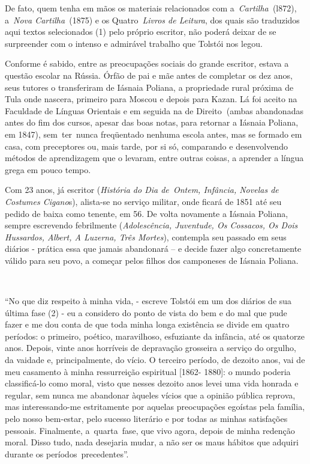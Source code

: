 De fato, quem tenha em mãos os materiais relacionados com
a~\emph{Cartilha~}(l872), a~\emph{Nova Cartilha~}(1875) e os
Quatro~\emph{Livros de Leitura}, dos quais são traduzidos aqui textos
selecionados (1) pelo próprio escritor, não poderá deixar de se
surpreender com o intenso e admirável trabalho que Tolstói nos legou.

Conforme é sabido, entre as preocupações sociais do grande escritor,
estava a questão escolar na Rússia. Órfão de pai e mãe antes de
completar os dez anos, seus tutores o transferiram de Iásnaia Poliana, a
propriedade rural próxima de Tula onde nascera, primeiro para Moscou e
depois para Kazan. Lá foi aceito na Faculdade de Línguas Orientais e em
seguida na de Direito\textbf{~}(ambas abandonadas antes do fim dos
cursos, apesar das boas notas, para retornar a Iásnaia Poliana, em
1847), sem~ter~nunca freqüentado nenhuma escola antes, mas se formado em
casa, com preceptores ou, mais tarde, por si só, comparando e
desenvolvendo métodos de aprendizagem que o levaram, entre outras
coisas, a aprender a língua grega em pouco tempo.

Com 23 anos, já escritor (\emph{História do Dia de~Ontem, Infância,
Novelas de Costumes Cigano}s), alista-se no serviço militar, onde ficará
de 1851 até seu pedido de baixa como tenente, em 56. De volta novamente
a Iásnaia Poliana, sempre escrevendo febrilmente (\emph{Adolescência,
Juventude, Os Cossacos, Os Dois Hussardos, Albert, A Luzerna, Três
Mortes}), contempla seu passado em seus diários - prática essa que
jamais abandonará -- e decide fazer algo concretamente válido para seu
povo, a começar pelos filhos dos camponeses de Iásnaia Poliana.~

~

``No que diz respeito à minha vida, - escreve Tolstói em um dos diários
de sua última fase (2) - eu a considero do ponto de vista do bem e do
mal que pude fazer e me dou conta de que toda minha longa existência se
divide em quatro períodos: o primeiro, poético, maravilhoso, esfuziante
da infância, até os quatorze anos. Depois, vinte anos horríveis de
depravação grosseira a serviço do orgulho, da vaidade e, principalmente,
do vício. O terceiro período, de dezoito anos, vai de meu casamento à
minha ressurreição espiritual {[}1862- 1880{]}: o mundo poderia
classificá-lo como moral, visto que nesses dezoito anos levei uma vida
honrada e regular, sem nunca me abandonar àqueles vícios que a opinião
pública reprova, mas interessando-me estritamente por aquelas
preocupações egoístas pela família, pelo nosso bem-estar, pelo sucesso
literário e por todas as minhas satisfações pessoais. Finalmente,
a~quarta~fase, que vivo agora, depois de minha redenção moral. Disso
tudo, nada desejaria mudar, a não ser os maus hábitos que adquiri
durante os períodos~precedentes''.

